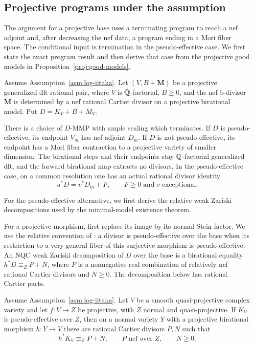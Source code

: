 \subsection{Projective programs under the assumption}
\label{rank:projective-program-input}

The argument for a projective base uses a terminating program to reach a nef
adjoint and, after decreasing the nef data, a program ending in a Mori fiber
space. The conditional input is termination in the pseudo-effective case.
We first state the exact program result and then derive that case from the
projective good models in Proposition~\ref{proj:good-models}.

\begin{proposition}
\label{proj:generalized-mmp}
Assume Assumption~\ref{asm:log-iitaka}. Let
\((V,B+\boldsymbol M)\) be a projective generalized dlt rational pair,
where \(V\) is \(\mathbb Q\)-factorial, \(B\geq0\), and the nef b-divisor
\(\boldsymbol M\) is determined by a nef rational Cartier divisor on a
projective birational model. Put \(D=K_V+B+M_V\).

There is a choice of \(D\)-MMP with ample scaling which terminates. If
\(D\) is pseudo-effective, its endpoint \(V_m\) has nef adjoint \(D_m\).
If \(D\) is not pseudo-effective, its endpoint has a Mori fiber contraction
to a projective variety of smaller dimension. The birational steps and their
endpoints stay \(\mathbb Q\)-factorial generalized dlt, and the forward birational
map extracts no divisors.
In the pseudo-effective case, on a common resolution one has an actual
rational divisor identity
\[
 u^*D=v^*D_m+F,\qquad F\geq0\text{ and }v\text{-exceptional}.
\]
\end{proposition}

For the pseudo-effective alternative, we first derive the relative weak
Zariski decompositions used by the minimal-model existence theorem.

For a projective morphism, first replace its image by its normal Stein
factor. We use the relative convention of \cite[Section~2]{TsakanikasXie}:
a divisor is pseudo-effective over the base when its restriction to a very
general fiber of this surjective morphism is pseudo-effective. An NQC weak Zariski decomposition of \(D\) over the
base is a birational equality \(h^*D\equiv_Z P+N\), where \(P\) is a
nonnegative real combination of relatively nef rational Cartier divisors
and \(N\geq0\). The decomposition below has rational Cartier parts.

\begin{lemma}\label{proj:relative-wzd}
Assume Assumption~\ref{asm:log-iitaka}. Let \(V\) be a smooth
quasi-projective complex variety and let \(f:V\to Z\) be projective, with
\(Z\) normal and quasi-projective. If \(K_V\) is pseudo-effective over
\(Z\), then on a normal variety \(Y\) with a projective birational morphism \(h:Y\to V\) there
are rational Cartier divisors \(P,N\) such that
\[
 h^*K_V\equiv_Z P+N,\qquad P\text{ nef over }Z,\qquad N\geq0.
\]
\end{lemma}

